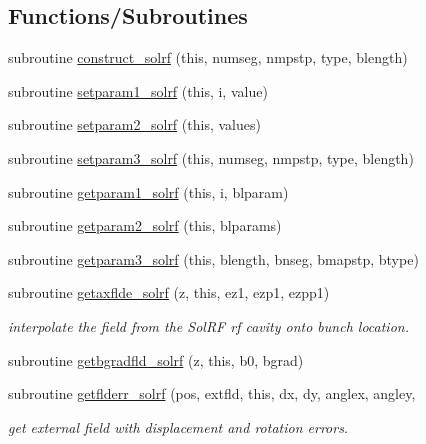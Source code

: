 \subsection*{Functions/\+Subroutines}
\begin{DoxyCompactItemize}
\item 
subroutine \mbox{\hyperlink{namespacesolrfclass_a3d7deb451633bf4e6fc42e0b43f21e2e}{construct\+\_\+solrf}} (this, numseg, nmpstp, type, blength)
\item 
subroutine \mbox{\hyperlink{namespacesolrfclass_ad06b3becdb99ba947f714809bea2af35}{setparam1\+\_\+solrf}} (this, i, value)
\item 
subroutine \mbox{\hyperlink{namespacesolrfclass_a4f5cee7483285ca745064b5331f3c30f}{setparam2\+\_\+solrf}} (this, values)
\item 
subroutine \mbox{\hyperlink{namespacesolrfclass_ae51249f1d976b6ff71436430614a854e}{setparam3\+\_\+solrf}} (this, numseg, nmpstp, type, blength)
\item 
subroutine \mbox{\hyperlink{namespacesolrfclass_af623613497d4af2070e81c255374535e}{getparam1\+\_\+solrf}} (this, i, blparam)
\item 
subroutine \mbox{\hyperlink{namespacesolrfclass_ac8cc63a77159c54d547e156bf816e7d1}{getparam2\+\_\+solrf}} (this, blparams)
\item 
subroutine \mbox{\hyperlink{namespacesolrfclass_abb727d5c5f8ebd6af19e036fe9204923}{getparam3\+\_\+solrf}} (this, blength, bnseg, bmapstp, btype)
\item 
subroutine \mbox{\hyperlink{namespacesolrfclass_a1033b422b682ef72ecc3b482c38b5065}{getaxflde\+\_\+solrf}} (z, this, ez1, ezp1, ezpp1)
\begin{DoxyCompactList}\small\item\em interpolate the field from the Sol\+RF rf cavity onto bunch location. \end{DoxyCompactList}\item 
subroutine \mbox{\hyperlink{namespacesolrfclass_adf7673f885573c8468f07faebc432d7d}{getbgradfld\+\_\+solrf}} (z, this, b0, bgrad)
\item 
subroutine \mbox{\hyperlink{namespacesolrfclass_a8a44826fce541cba8b4f7f5573ec7c98}{getflderr\+\_\+solrf}} (pos, extfld, this, dx, dy, anglex, angley,
\begin{DoxyCompactList}\small\item\em get external field with displacement and rotation errors. \end{DoxyCompactList}\item 

\end{DoxyCompactItemize}
